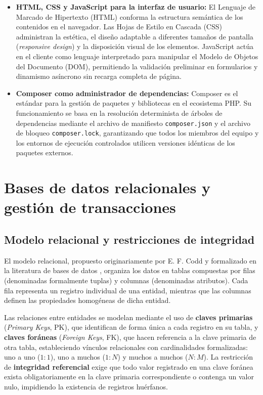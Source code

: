 \begin{itemize}
    \item \textbf{HTML, CSS y JavaScript para la interfaz de usuario:} El Lenguaje de Marcado de Hipertexto (HTML) conforma la estructura semántica de los contenidos en el navegador. Las Hojas de Estilo en Cascada (CSS) administran la estética, el diseño adaptable a diferentes tamaños de pantalla (\textit{responsive design}) y la disposición visual de los elementos. JavaScript actúa en el cliente como lenguaje interpretado para manipular el Modelo de Objetos del Documento (DOM), permitiendo la validación preliminar en formularios y dinamismo asíncrono sin recarga completa de página.
    \item \textbf{Composer como administrador de dependencias:} Composer es el estándar para la gestión de paquetes y bibliotecas en el ecosistema PHP. Su funcionamiento se basa en la resolución determinista de árboles de dependencias mediante el archivo de manifiesto \texttt{composer.json} y el archivo de bloqueo \texttt{composer.lock}, garantizando que todos los miembros del equipo y los entornos de ejecución controlados utilicen versiones idénticas de los paquetes externos.
\end{itemize}

\section{Bases de datos relacionales y gestión de transacciones}

\subsection{Modelo relacional y restricciones de integridad}

El modelo relacional, propuesto originariamente por E. F. Codd y formalizado en la literatura de bases de datos \cite{elmasri2016fundamentals}, organiza los datos en tablas compuestas por filas (denominadas formalmente tuplas) y columnas (denominadas atributos). Cada fila representa un registro individual de una entidad, mientras que las columnas definen las propiedades homogéneas de dicha entidad.

Las relaciones entre entidades se modelan mediante el uso de \textbf{claves primarias} (\textit{Primary Keys}, PK), que identifican de forma única a cada registro en su tabla, y \textbf{claves foráneas} (\textit{Foreign Keys}, FK), que hacen referencia a la clave primaria de otra tabla, estableciendo vínculos relacionales con cardinalidades formalizadas: uno a uno ($1:1$), uno a muchos ($1:N$) y muchos a muchos ($N:M$). La restricción de \textbf{integridad referencial} exige que todo valor registrado en una clave foránea exista obligatoriamente en la clave primaria correspondiente o contenga un valor nulo, impidiendo la existencia de registros huérfanos.

